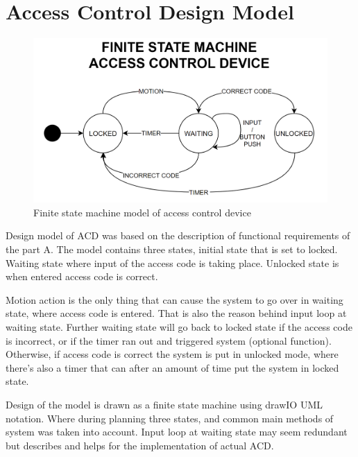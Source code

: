 \section{Access Control Design Model}
\label{sec:ACD_model}

\begin{figure}[h]
  \centering
  \includegraphics[scale=0.5]{figs/FNS.png}
  \caption{Finite state machine model of access control device}
  \label{fig:framework}
\end{figure}

Design model of ACD was based on the description of functional requirements of the part A. The model contains three states, initial state that is set to locked. Waiting state where input of the access code is taking place. Unlocked state is when entered access code is correct. 
\newline

Motion action is the only thing that can cause the system to go over in waiting state, where access code is entered. That is also the reason behind input loop at waiting state. Further waiting state will go back to locked state if the access code is incorrect, or if the timer ran out and triggered system (optional function). Otherwise, if access code is correct the system is put in unlocked mode, where there’s also a timer that can after an amount of time put the system in locked state.
\newline

Design of the model is drawn as a finite state machine using drawIO UML notation. Where during planning three states, and common main methods of system was taken into account. Input loop at waiting state may seem redundant but describes and helps for the implementation of actual ACD. 


